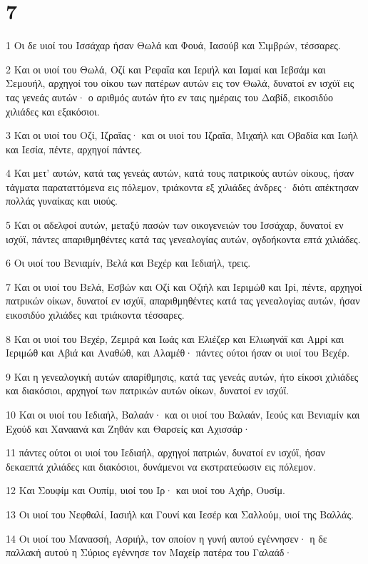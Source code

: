 \chapter{7}

\par 1 Οι δε υιοί του Ισσάχαρ ήσαν Θωλά και Φουά, Ιασούβ και Σιμβρών, τέσσαρες.
\par 2 Και οι υιοί του Θωλά, Οζί και Ρεφαΐα και Ιεριήλ και Ιαμαί και Ιεβσάμ και Σεμουήλ, αρχηγοί του οίκου των πατέρων αυτών εις τον Θωλά, δυνατοί εν ισχύϊ εις τας γενεάς αυτών· ο αριθμός αυτών ήτο εν ταις ημέραις του Δαβίδ, εικοσιδύο χιλιάδες και εξακόσιοι.
\par 3 Και οι υιοί του Οζί, Ιζραΐας· και οι υιοί του Ιζραΐα, Μιχαήλ και Οβαδία και Ιωήλ και Ιεσία, πέντε, αρχηγοί πάντες.
\par 4 Και μετ' αυτών, κατά τας γενεάς αυτών, κατά τους πατρικούς αυτών οίκους, ήσαν τάγματα παραταττόμενα εις πόλεμον, τριάκοντα εξ χιλιάδες άνδρες· διότι απέκτησαν πολλάς γυναίκας και υιούς.
\par 5 Και οι αδελφοί αυτών, μεταξύ πασών των οικογενειών του Ισσάχαρ, δυνατοί εν ισχύϊ, πάντες απαριθμηθέντες κατά τας γενεαλογίας αυτών, ογδοήκοντα επτά χιλιάδες.
\par 6 Οι υιοί του Βενιαμίν, Βελά και Βεχέρ και Ιεδιαήλ, τρεις.
\par 7 Και οι υιοί του Βελά, Εσβών και Οζί και Οζιήλ και Ιεριμώθ και Ιρί, πέντε, αρχηγοί πατρικών οίκων, δυνατοί εν ισχύϊ, απαριθμηθέντες κατά τας γενεαλογίας αυτών, ήσαν εικοσιδύο χιλιάδες και τριάκοντα τέσσαρες.
\par 8 Και οι υιοί του Βεχέρ, Ζεμιρά και Ιωάς και Ελιέζερ και Ελιωηνάϊ και Αμρί και Ιεριμώθ και Αβιά και Αναθώθ, και Αλαμέθ· πάντες ούτοι ήσαν οι υιοί του Βεχέρ.
\par 9 Και η γενεαλογική αυτών απαρίθμησις, κατά τας γενεάς αυτών, ήτο είκοσι χιλιάδες και διακόσιοι, αρχηγοί των πατρικών αυτών οίκων, δυνατοί εν ισχύϊ.
\par 10 Και οι υιοί του Ιεδιαήλ, Βαλαάν· και οι υιοί του Βαλαάν, Ιεούς και Βενιαμίν και Εχούδ και Χαναανά και Ζηθάν και Θαρσείς και Αχισσάρ·
\par 11 πάντες ούτοι οι υιοί του Ιεδιαήλ, αρχηγοί πατριών, δυνατοί εν ισχύϊ, ήσαν δεκαεπτά χιλιάδες και διακόσιοι, δυνάμενοι να εκστρατεύωσιν εις πόλεμον.
\par 12 Και Σουφίμ και Ουπίμ, υιοί του Ιρ· και υιοί του Αχήρ, Ουσίμ.
\par 13 Οι υιοί του Νεφθαλί, Ιασιήλ και Γουνί και Ιεσέρ και Σαλλούμ, υιοί της Βαλλάς.
\par 14 Οι υιοί του Μανασσή, Ασριήλ, τον οποίον η γυνή αυτού εγέννησεν· η δε παλλακή αυτού η Σύριος εγέννησε τον Μαχείρ πατέρα του Γαλαάδ·
